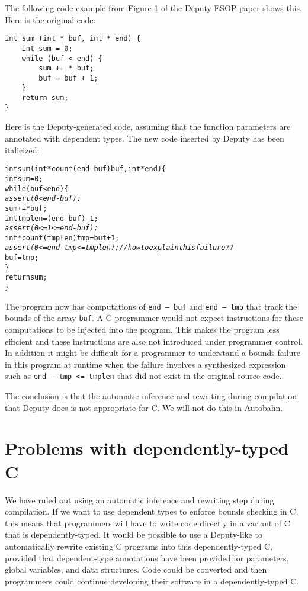 The following code example from Figure 1 of the Deputy ESOP paper shows
this. Here is the original code:
\begin{verbatim}
int sum (int * buf, int * end) {
    int sum = 0;
    while (buf < end) {
        sum += * buf;
        buf = buf + 1;
    }
    return sum;
}
\end{verbatim}

Here is the Deputy-generated code, assuming that the function parameters
are annotated with dependent types. The new code inserted by Deputy has
been italicized:

\begin{alltt}
int sum (int * count(end - buf) buf, int * end) \{
    int sum = 0;
    while (buf < end) \{
        \textit{assert(0 < end - buf);}
        sum += * buf;
        int tmplen = (end - buf) - 1;
        \textit{assert(0 <= 1 <= end - buf);}
        int * count(tmplen) tmp = buf + 1;
        \textit{assert(0 <= end - tmp <= tmplen);  // how to explain this failure??}
        buf = tmp;
    \}
    return sum;
\}
\end{alltt}

The program now has computations of \texttt{end -- buf} and \texttt{end
-- tmp} that track the bounds of the array \texttt{buf}. A C programmer
would not expect instructions for these computations to be injected into
the program. This makes the program less efficient and these
instructions are also not introduced under programmer control. In
addition it might be difficult for a programmer to understand a bounds
failure in this program at runtime when the failure involves a
synthesized expression such as \verb|end - tmp <= tmplen| that did not
exist in the original source code.

The conclusion is that the automatic inference and rewriting during
compilation that Deputy does is not appropriate for C. We will not do
this in Autobahn.

\section{Problems with dependently-typed C}\label{problems-with-dependently-typed-c}

We have ruled out using an automatic inference and rewriting step during
compilation. If we want to use dependent types to enforce bounds
checking in C, this means that programmers will have to write code
directly in a variant of C that is dependently-typed. It would be
possible to use a Deputy-like to automatically rewrite existing C
programs into this dependently-typed C, provided that dependent-type
annotations have been provided for parameters, global variables, and
data structures. Code could be converted and then programmers could
continue developing their software in a dependently-typed C.

